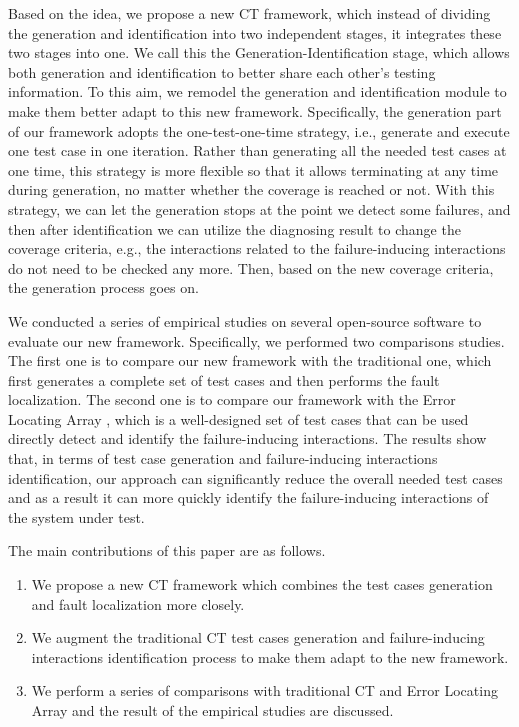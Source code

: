 \documentclass{sig-alternate}
\begin{document}
Based on the idea, we propose a new CT framework, which instead of dividing the generation and identification into two independent stages, it integrates these two stages into one. We call this the Generation-Identification stage, which allows both generation and identification to better share each other's testing information. To this aim, we remodel the generation and identification module to make them better adapt to this new framework. Specifically, the generation part of our framework adopts the one-test-one-time strategy, i.e., generate and execute one test case in one iteration. Rather than generating all the needed test cases at one time, this strategy is more flexible so that it allows terminating at any time during generation, no matter whether the coverage is reached or not. With this strategy, we can let the generation stops at the point we detect some failures, and then after identification we can utilize the diagnosing result to change the coverage criteria, e.g., the interactions related to the failure-inducing interactions do not need to be checked any more. Then, based on the new coverage criteria, the generation process goes on.


We conducted a series of empirical studies on several open-source software to evaluate our new framework. Specifically, we performed two comparisons studies. The first one is to compare our new framework with the traditional one, which first generates a complete set of test cases and then performs the fault localization. The second one is to compare our framework with the Error Locating Array \cite{martinez2008algorithms,martinez2009locating}, which is a well-designed set of test cases that can be used directly detect and identify the failure-inducing interactions. The results show that, in terms of test case generation and failure-inducing interactions identification, our approach can significantly reduce the overall needed test cases and as a result it can more quickly identify the failure-inducing interactions of the system under test.

The main contributions of this paper are as follows.

 \begin{enumerate}
 \item  We propose a new CT framework which combines the test cases generation and fault localization more closely.
 \item  We augment the traditional CT test cases generation and failure-inducing interactions identification process to make them adapt to the new framework.
 \item We perform a series of comparisons with traditional CT and Error Locating Array and the result of the empirical studies are discussed.
\end{enumerate}
\end{document}
